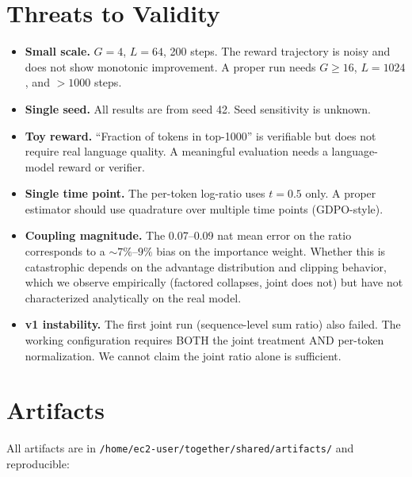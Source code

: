 \documentclass{article}
\begin{document}
\section{Threats to Validity}

\begin{itemize}
\item \textbf{Small scale.} $G{=}4$, $L{=}64$, 200 steps. The reward trajectory is noisy and does not show monotonic improvement. A proper run needs $G\geq16$, $L{=}1024$, and $>1000$ steps.
\item \textbf{Single seed.} All results are from seed 42. Seed sensitivity is unknown.
\item \textbf{Toy reward.} ``Fraction of tokens in top-1000'' is verifiable but does not require real language quality. A meaningful evaluation needs a language-model reward or verifier.
\item \textbf{Single time point.} The per-token log-ratio uses $t{=}0.5$ only. A proper estimator should use quadrature over multiple time points (GDPO-style).
\item \textbf{Coupling magnitude.} The 0.07--0.09 nat mean error on the ratio corresponds to a $\sim7\%$--$9\%$ bias on the importance weight. Whether this is catastrophic depends on the advantage distribution and clipping behavior, which we observe empirically (factored collapses, joint does not) but have not characterized analytically on the real model.
\item \textbf{v1 instability.} The first joint run (sequence-level sum ratio) also failed. The working configuration requires BOTH the joint treatment AND per-token normalization. We cannot claim the joint ratio alone is sufficient.
\end{itemize}

\section{Artifacts}

All artifacts are in \texttt{/home/ec2-user/together/shared/artifacts/} and reproducible:
\end{document}
